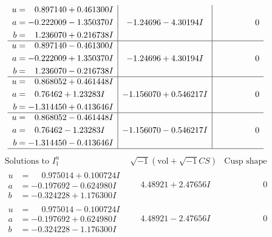 \documentclass[1p]{elsarticle_modified}
\theoremstyle{definition}
\newcommand{\I}{\sqrt{-1}}
\begin{document}
$$\begin{array}{c|c|c}
\begin{aligned}
u &= \phantom{-}0.897140 + 0.461300 I \\
a &= -0.222009 - 1.350370 I \\
b &= \phantom{-}1.236070 + 0.216738 I\end{aligned}
 & -1.24696 - 4.30194 I & \phantom{-0.000000 } 0 \\ \hline\begin{aligned}
u &= \phantom{-}0.897140 - 0.461300 I \\
a &= -0.222009 + 1.350370 I \\
b &= \phantom{-}1.236070 - 0.216738 I\end{aligned}
 & -1.24696 + 4.30194 I & \phantom{-0.000000 } 0 \\ \hline\begin{aligned}
u &= \phantom{-}0.868052 + 0.461448 I \\
a &= \phantom{-}0.76462 + 1.23283 I \\
b &= -1.314450 + 0.413646 I\end{aligned}
 & -1.156070 + 0.546217 I & \phantom{-0.000000 } 0 \\ \hline\begin{aligned}
u &= \phantom{-}0.868052 - 0.461448 I \\
a &= \phantom{-}0.76462 - 1.23283 I \\
b &= -1.314450 - 0.413646 I\end{aligned}
 & -1.156070 - 0.546217 I & \phantom{-0.000000 } 0\\
 \hline 
 \end{array}$$\newpage$$\begin{array}{c|c|c}  
\text{Solutions to }I^u_{1}& \I (\text{vol} + \sqrt{-1}CS) & \text{Cusp shape}\\
 \hline 
\begin{aligned}
u &= \phantom{-}0.975014 + 0.100724 I \\
a &= -0.197692 - 0.624980 I \\
b &= -0.324228 + 1.176300 I\end{aligned}
 & \phantom{-}4.48921 + 2.47656 I & \phantom{-0.000000 } 0 \\ \hline\begin{aligned}
u &= \phantom{-}0.975014 - 0.100724 I \\
a &= -0.197692 + 0.624980 I \\
b &= -0.324228 - 1.176300 I\end{aligned}
 & \phantom{-}4.48921 - 2.47656 I & \phantom{-0.000000 } 0 \\ \hline\begin{aligned}

\end{aligned}
\end{array}$$
\end{document}
